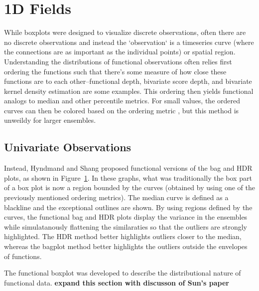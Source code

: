 \documentclass[../main.tex]{subfiles}
\begin{document}
\section{1D Fields}
While boxplots were designed to visualize discrete observations, often there
are no discrete observations and instead the `observation` is a timeseries
curve (where the connections are as important as the individual points) or
spatial region. Understanding the distributions of functional observations
often relies first ordering the functions such that there's some measure of how
close these functions are to each other--functional depth\cite{febrero2007},
bivariate score depth\cite{hyndman2009}, and
bivariate kernel density estimation\cite{scott1992} are some examples. This
ordering then yields functional analogs to median and other percentile
metrics. For small values, the ordered curves can then be colored based on the
ordering metric \cite{hyndman2009}, but this method is unweildy for larger
ensembles.

\subsection{Univariate Observations}

\begin{figure}
  \label{fig:funcbag}
\end{figure}
Instead, Hyndmand and Shang proposed functional versions of the bag and HDR
plots\cite{hyndman2009}, as shown in Figure~\ref{fig:funcbag}. In these graphs,
what was traditionally the box part of a box plot is now a region bounded by
the curves (obtained by using one of the previously mentioned ordering
metrics). The median curve is defined as a blackline and the exceptional
outlines are shown. By using regions defined by the curves, the functional bag
and HDR plots display the variance in the ensembles while simulatanously
flattening the similaraties so that the outliers are strongly highlighted. The
HDR method better highlights outliers closer to the median, whereas the bagplot
method better highlights the outliers outside the envelopes of functions.



The functional boxplot was developed to describe the distributional nature of
functional data\cite{sun2011}. \textbf{expand this section with discusson of
  Sun's paper}
\end{document}
